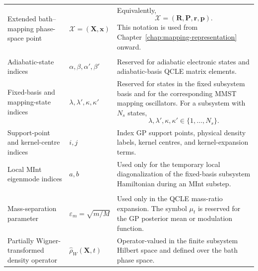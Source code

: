\documentclass[
  11pt,
  letterpaper,
  onehalfspacing,
  normalmargins,
  equalmargins,
  oneside
]{ut-thesis}
\begin{document}
\begin{longtable}{
@{}
>{\raggedright\arraybackslash}p{}
>{\raggedright\arraybackslash}p{}
>{\raggedright\arraybackslash}p{}
@{}
}
Extended bath--mapping phase-space point
&
\(\boldsymbol{\mathcal X}=(\mathbf X,\mathbf x)\)
&
Equivalently,
\[
\boldsymbol{\mathcal X}
=
(\mathbf R,\mathbf P,\mathbf r,\mathbf p).
\]
This notation is used from
Chapter~\ref{chap:mapping-representation} onward.
\\


\addlinespace[0.6em]
\multicolumn{3}{@{}l}{
\textbf{Index conventions}
}
\\
\addlinespace[0.3em]

Adiabatic-state indices
&
\(\alpha,\beta,\alpha',\beta'\)
&
Reserved for adiabatic electronic states and adiabatic-basis QCLE matrix
elements.
\\

Fixed-basis and mapping-state indices
&
\(\lambda,\lambda',\kappa,\kappa'\)
&
Reserved for states in the fixed subsystem basis and for the corresponding
MMST mapping oscillators. For a subsystem with \(N_s\) states,
\[
\lambda,\lambda',\kappa,\kappa'
\in\{1,\ldots,N_s\}.
\]
\\

Support-point and kernel-centre indices
&
\(i,j\)
&
Index GP support points, physical density labels, kernel centres, and
kernel-expansion terms.
\\

Local MInt eigenmode indices
&
\(a,b\)
&
Used only for the temporary local diagonalization of the fixed-basis
subsystem Hamiltonian during an MInt substep.
\\


\addlinespace[0.6em]
\multicolumn{3}{@{}l}{
\textbf{Quantum--classical and mapping densities}
}
\\
\addlinespace[0.3em]

Mass-separation parameter
&
\(\varepsilon_m=\sqrt{m/M}\)
&
Used only in the QCLE mass-ratio expansion. The symbol \(\mu_t\) is reserved
for the GP posterior mean or modulation function.
\\

Partially Wigner-transformed density operator
&
\(\hat\rho_W(\mathbf X,t)\)
&
Operator-valued in the finite subsystem Hilbert space and defined over the
bath phase space.
\\


\end{longtable}
\end{document}

